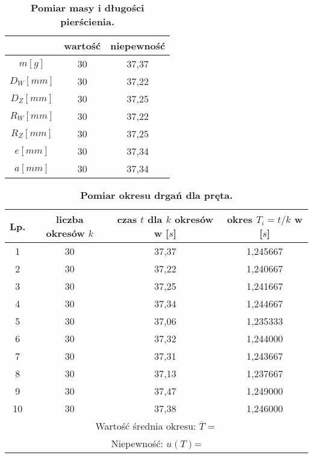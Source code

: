 \documentclass[a4paper,11pt]{article}
\begin{document}
\begin{table}[ht]
\centering
\setlength{\extrarowheight}{2pt}
\caption{\textbf{Pomiar masy i długości pierścienia.}}
\begin{tabular}{| @{\hspace{8mm}}c @{\hspace{8mm}}| @{\hspace{8mm}}c @{\hspace{8mm}}|@{\hspace{8mm}} c@{\hspace{8mm}}|}
\hline
 & wartość & niepewność  \\ \hline
$m[g]$ & 30 & 37,37 \\ \hline
$D_{W}[mm]$ & 30 & 37,22 \\ \hline
$D_{Z}[mm]$ & 30 & 37,25 \\ \hline
$R_{W}[mm]$ & 30 & 37,22 \\ \hline
$R_{Z}[mm]$ & 30 & 37,25 \\ \hline
$e[mm]$ & 30 & 37,34 \\ \hline
$a[mm]$ & 30 & 37,34 \\ \hline

\end{tabular}
\end{table}

\begin{table}[ht]
\centering
\setlength{\extrarowheight}{2pt}
\caption{\textbf{Pomiar okresu drgań dla pręta.}}
\begin{tabular}{|c|c|c|c|}
\hline
Lp. & liczba okresów $k$ & czas $t$ dla $k$ okresów w [$s$] & okres $T_{i}=t/k$ w [$s$] \\ \hline
1 & 30 & 37,37 & 1,245667\\ \hline
2 & 30 & 37,22 & 1,240667\\ \hline
3 & 30 & 37,25 & 1,241667\\ \hline
4 & 30 & 37,34 & 1,244667\\ \hline
5 & 30 & 37,06 & 1,235333\\ \hline
6 & 30 & 37,32 & 1,244000\\ \hline
7 & 30 & 37,31 & 1,243667\\ \hline
8 & 30 & 37,13 & 1,237667\\ \hline
9 & 30 & 37,47 & 1,249000\\ \hline
10 & 30 & 37,38 & 1,246000\\ \hline
\multicolumn{4}{|c|}{Wartość średnia okresu: $\overline{T}= $} \\ \hline
\multicolumn{4}{|c|}{Niepewność: $u(T)$=} \\ \hline
\end{tabular}
\end{table}
\end{document}
